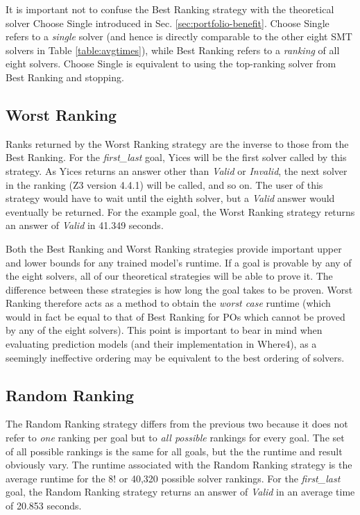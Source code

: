 It is important not to confuse the \textsf{Best Ranking} strategy with the theoretical solver \textsf{Choose Single} introduced in Sec. \ref{sec:portfolio-benefit}. 
\textsf{Choose Single} refers to a \textit{single} solver (and hence is directly comparable to the other eight SMT solvers in Table \ref{table:avgtimes}), while \textsf{Best Ranking} refers to a \textit{ranking} of all eight solvers. \textsf{Choose Single} is equivalent to using the top-ranking solver from \textsf{Best Ranking} and stopping.

\subsection{\textsf{Worst Ranking}}
\label{sub:worst}

Ranks returned by the \textsf{Worst Ranking} strategy are the inverse to those from the \textsf{Best Ranking}. 
For the \textit{first\_last} goal, Yices will be the first solver called by this strategy.
As Yices returns an answer other than \textit{Valid} or \textit{Invalid}, the next solver in the ranking (Z3 version 4.4.1) will be called, and so on.
The user of this strategy would have to wait until the eighth solver, but a \textit{Valid} answer would eventually be returned.
For the example goal, the \textsf{Worst Ranking} strategy returns an answer of \textit{Valid} in 41.349 seconds.

Both the \textsf{Best Ranking} and \textsf{Worst Ranking} strategies provide important upper and lower bounds for any trained model's runtime.
If a goal is provable by any of the eight solvers, all of our theoretical strategies will be able to prove it.
The difference between these strategies is how long the goal takes to be proven.  
\textsf{Worst Ranking} therefore acts as a method to obtain the  \textit{worst case} runtime (which would in fact be equal to that of \textsf{Best Ranking} for POs which cannot be proved by any of the eight solvers).
This point is important to bear in mind when evaluating prediction models (and their implementation in \textsf{Where4}), as a seemingly ineffective ordering may be equivalent to the best ordering of solvers. 


\subsection{\textsf{Random Ranking}}

The \textsf{Random Ranking} strategy differs from the previous two because it does not refer to \textit{one} ranking per goal but to \textit{all possible} rankings for every goal.
The set of all possible rankings is the same for all goals, but the the runtime and result obviously vary. 
The runtime associated with the \textsf{Random Ranking} strategy is the average runtime for the 8! or 40,320 possible solver rankings.
For the \textit{first\_last} goal, the \textsf{Random Ranking} strategy returns an answer of \textit{Valid} in an average time of 20.853 seconds.

